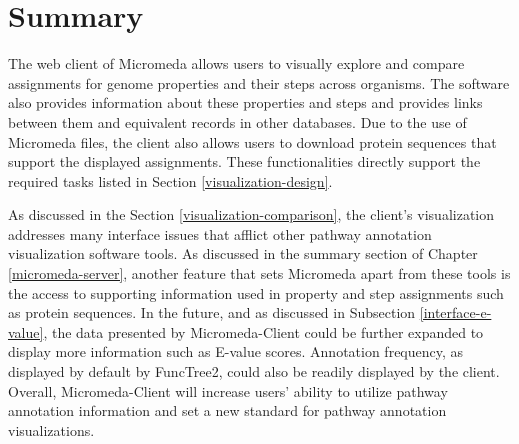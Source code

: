 \section{Summary} \label{micromeda-client-summary}

The web client of Micromeda allows users to visually explore and compare 
assignments for genome properties and their steps across organisms. The software 
also provides information about these properties and steps and provides links 
between them and equivalent records in other databases. Due to the use of 
Micromeda files, the client also allows users to download protein sequences that 
support the displayed assignments. These functionalities directly support the 
required tasks listed in Section \ref{visualization-design}.

As discussed in the Section \ref{visualization-comparison}, the client's 
visualization addresses many interface issues that afflict other pathway 
annotation visualization software tools. As discussed in the summary section of 
Chapter \ref{micromeda-server}, another feature that sets Micromeda apart from 
these tools is the access to supporting information used in property and 
step assignments such as protein sequences. In the future, and as discussed in 
Subsection \ref{interface-e-value}, the data presented by Micromeda-Client could 
be further expanded to display more information such as E-value scores. 
Annotation frequency, as displayed by default by FuncTree2, could also be 
readily displayed by the client. Overall, Micromeda-Client will increase users' 
ability to utilize pathway annotation information and set a new standard for 
pathway annotation visualizations.
